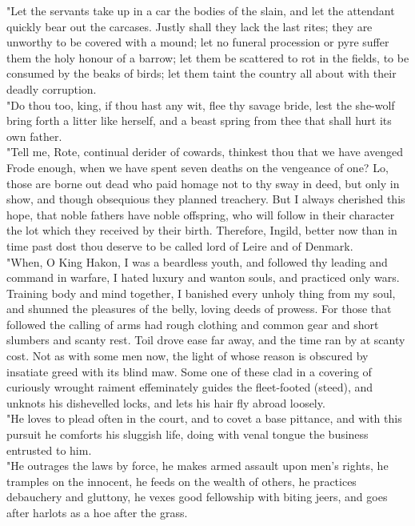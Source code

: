 \documentclass[10pt,a4paper]{report}
\begin{document}
"Let the servants take up in a car the bodies of the slain, and let the attendant quickly bear out the carcases. Justly shall they lack the last rites; they are unworthy to be covered with a mound; let no funeral procession or pyre suffer them the holy honour of a barrow; let them be scattered to rot in the fields, to be consumed by the beaks of birds; let them taint the country all about with their deadly corruption.\\

"Do thou too, king, if thou hast any wit, flee thy savage bride, lest the she-wolf bring forth a litter like herself, and a beast spring from thee that shall hurt its own father.\\

"Tell me, Rote, continual derider of cowards, thinkest thou that we have avenged Frode enough, when we have spent seven deaths on the vengeance of one? Lo, those are borne out dead who paid homage not to thy sway in deed, but only in show, and though obsequious they planned treachery. But I always cherished this hope, that noble fathers have noble offspring, who will follow in their character the lot which they received by their birth. Therefore, Ingild, better now than in time past dost thou deserve to be called lord of Leire and of Denmark.\\

"When, O King Hakon, I was a beardless youth, and followed thy leading and command in warfare, I hated luxury and wanton souls, and practiced only wars. Training body and mind together, I banished every unholy thing from my soul, and shunned the pleasures of the belly, loving deeds of prowess. For those that followed the calling of arms had rough clothing and common gear and short slumbers and scanty rest. Toil drove ease far away, and the time ran by at scanty cost. Not as with some men now, the light of whose reason is obscured by insatiate greed with its blind maw. Some one of these clad in a covering of curiously wrought raiment effeminately guides the fleet-footed (steed), and unknots his dishevelled locks, and lets his hair fly abroad loosely.\\

"He loves to plead often in the court, and to covet a base pittance, and with this pursuit he comforts his sluggish life, doing with venal tongue the business entrusted to him.\\

"He outrages the laws by force, he makes armed assault upon men's rights, he tramples on the innocent, he feeds on the wealth of others, he practices debauchery and gluttony, he vexes good fellowship with biting jeers, and goes after harlots as a hoe after the grass.\\
\end{document}
